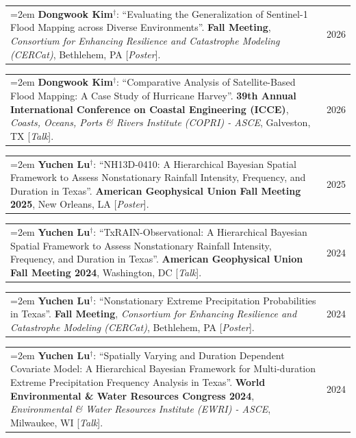 \documentclass[10pt,oneside]{article}
\makeatletter
\newenvironment{alignedentrieshang}[1][2em]{%
  \noindent%
}{%
}
\newcommand{\hangingitem}[2]{%
  \noindent%
  \begin{tabular*}{\textwidth}{@{}p{0.85\textwidth}@{\extracolsep{\fill}}r@{}}%
    \hangindent=2em \hangafter=1 #1 & #2%
  \end{tabular*}%
}
\makeatother
\begin{document}
\begin{alignedentrieshang}


\hangingitem{\textcolor{RiceBlue}{\textbf{Dongwook Kim}}$^\mathbf{\dagger}$: \enquote{Evaluating the Generalization of Sentinel-1 Flood Mapping across Diverse Environments}. \textbf{Fall Meeting}, \textit{Consortium for Enhancing Resilience and Catastrophe Modeling (CERCat)}, Bethlehem, PA [\textit{Poster}].}{2026}



\hangingitem{\textcolor{RiceBlue}{\textbf{Dongwook Kim}}$^\mathbf{\dagger}$: \enquote{Comparative Analysis of Satellite-Based Flood Mapping: A Case Study of Hurricane Harvey}. \textbf{39th Annual International Conference on Coastal Engineering (ICCE)}, \textit{Coasts, Oceans, Ports \& Rivers Institute (COPRI) - ASCE}, Galveston, TX [\textit{Talk}].}{2026}







\hangingitem{\textcolor{RiceBlue}{\textbf{Yuchen Lu}}$^\mathbf{\dagger}$: \enquote{NH13D-0410: A Hierarchical Bayesian Spatial Framework to Assess Nonstationary Rainfall Intensity, Frequency, and Duration in Texas}. \textbf{American Geophysical Union Fall Meeting 2025}, New Orleans, LA [\textit{Poster}].}{2025}









\hangingitem{\textcolor{RiceBlue}{\textbf{Yuchen Lu}}$^\mathbf{\dagger}$: \enquote{TxRAIN-Observational: A Hierarchical Bayesian Spatial Framework to Assess Nonstationary Rainfall Intensity, Frequency, and Duration in Texas}. \textbf{American Geophysical Union Fall Meeting 2024}, Washington, DC [\textit{Talk}].}{2024}





\hangingitem{\textcolor{RiceBlue}{\textbf{Yuchen Lu}}$^\mathbf{\dagger}$: \enquote{Nonstationary Extreme Precipitation Probabilities in Texas}. \textbf{Fall Meeting}, \textit{Consortium for Enhancing Resilience and Catastrophe Modeling (CERCat)}, Bethlehem, PA [\textit{Poster}].}{2024}







\hangingitem{\textcolor{RiceBlue}{\textbf{Yuchen Lu}}$^\mathbf{\dagger}$: \enquote{Spatially Varying and Duration Dependent Covariate Model: A Hierarchical Bayesian Framework for Multi-duration Extreme Precipitation Frequency Analysis in Texas}. \textbf{World Environmental \& Water Resources Congress 2024}, \textit{Environmental \& Water Resources Institute (EWRI) - ASCE}, Milwaukee, WI [\textit{Talk}].}{2024}




\end{alignedentrieshang}
\end{document}
